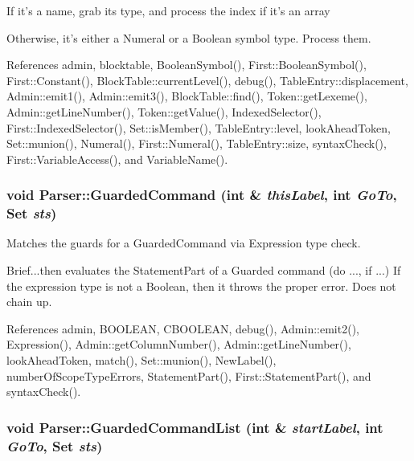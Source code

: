 If it's a name, grab its type, and process the index if it's an array

Otherwise, it's either a Numeral or a Boolean symbol type. Process them. 



References admin, blocktable, BooleanSymbol(), First::BooleanSymbol(), First::Constant(), BlockTable::currentLevel(), debug(), TableEntry::displacement, Admin::emit1(), Admin::emit3(), BlockTable::find(), Token::getLexeme(), Admin::getLineNumber(), Token::getValue(), IndexedSelector(), First::IndexedSelector(), Set::isMember(), TableEntry::level, lookAheadToken, Set::munion(), Numeral(), First::Numeral(), TableEntry::size, syntaxCheck(), First::VariableAccess(), and VariableName().

\hypertarget{classParser_a0259d21a13d0fcf20a813ad5ce70d454}{
\subsubsection[{GuardedCommand}]{\setlength{\rightskip}{0pt plus 5cm}void Parser::GuardedCommand (int \& {\em thisLabel}, \/  int {\em GoTo}, \/  {\bf Set} {\em sts})}}
\label{classParser_a0259d21a13d0fcf20a813ad5ce70d454}


Matches the guards for a GuardedCommand via Expression type check. 

Brief...then evaluates the StatementPart of a Guarded command (do ..., if ...) If the expression type is not a Boolean, then it throws the proper error. Does not chain up. 

References admin, BOOLEAN, CBOOLEAN, debug(), Admin::emit2(), Expression(), Admin::getColumnNumber(), Admin::getLineNumber(), lookAheadToken, match(), Set::munion(), NewLabel(), numberOfScopeTypeErrors, StatementPart(), First::StatementPart(), and syntaxCheck().

\hypertarget{classParser_a071376c630a3e05acaf3b16c35736bf2}{
\subsubsection[{GuardedCommandList}]{\setlength{\rightskip}{0pt plus 5cm}void Parser::GuardedCommandList (int \& {\em startLabel}, \/  int {\em GoTo}, \/  {\bf Set} {\em sts})}}
\label{classParser_a071376c630a3e05acaf3b16c35736bf2}


